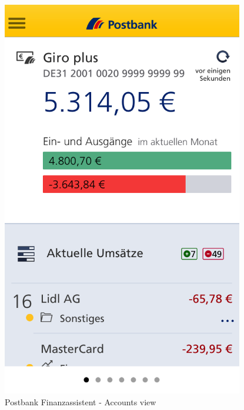 \begin{figure}[H]
\begin{minipage}[b]{.5\linewidth}
        \centering\includegraphics[width=0.94\textwidth]{img/screenshots/ex3p2.png}
    \end{minipage}
	\captionsetup{labelformat=empty}
    \caption[]{Postbank Finanzassistent - Accounts view}
\end{figure}

